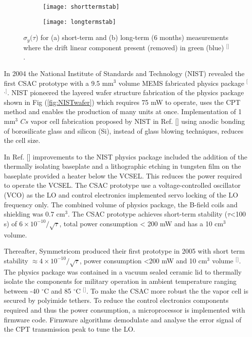 \begin{figure}[b]
\centering
\begin{subfigure}[b]{0.45\textwidth}
   \texttt{[image: shorttermstab]}
	\caption{\label{fig:shorttermstab}}
\end{subfigure}
\begin{subfigure}[b]{0.45\textwidth}
   \texttt{[image: longtermstab]}
	\caption{\label{fig:longtermstab}}
\end{subfigure}
\caption[]{$\sigma_{y}(\tau$) for (a) short-term and (b) long-term (6 months) measurements where the drift linear component present (removed) in green (blue) $^[$\citep{LutwakR.RashedA.Varghese2007TheEvaluation}$^]$.}
\end{figure}



In 2004 the National Institute of Standards and Technology (NIST) revealed the first CSAC prototype with a 9.5 mm$^3$ volume MEMS fabricated physics package $^[$\citep{Knappe2004AClock}$^,$\citep{Gerginov2005Component-levelReference}$^]$. NIST pioneered the layered wafer structure fabrication of the physics package shown in Fig (\ref{fig:NISTwafer}) which requires 75 mW to operate, uses the CPT method and enables the production of many units at once. Implementation of 1 mm$^3$ $Cs$ vapor cell fabrication proposed by NIST in Ref. [] using anodic bonding of borosilicate glass and silicon (Si), instead of glass blowing techniques, reduces the cell size.  



In Ref. [] improvements to the NIST physics package included the addition of the thermally isolating baseplate and a lithographic etching in tungsten film on the baseplate provided a heater below the VCSEL. This reduces the power required to operate the VCSEL. The CSAC prototype use a voltage-controlled oscillator (VCO) as the LO and control electronics implemented servo locking of the LO frequency only. The combined volume of physics package, the B-field coils and shielding was 0.7 cm$^{3}$. The CSAC prototype achieves short-term stability ($\tau$<100 s) of $6\times10^{-10}/\sqrt{\tau}$, total power consumption < 200 mW and has a 10 cm$^{3}$ volume.

Thereafter, Symmetricom produced their first prototype in 2005 with short term stability $\approx4\times 10^{-10}/\sqrt{\tau}$, power consumption <200 mW and 10 cm$^{3}$ volume $^[$\citep{LutwakTheClock}$^]$. The physics package was contained in a vacuum sealed ceramic lid to thermally isolate the components for military operation in ambient temperature ranging between -40 $^{\circ }\textrm{C}$ and 85 $^{\circ }\textrm{C}$ $^[$\citep{LutwakTheClock}$^]$. To make the CSAC more robust the the vapor cell is secured by polyimide tethers. To reduce the control electronics components required and thus the power consumption, a microprocessor is implemented with firmware code. Firmware algorithms demodulate and analyse the error signal of the CPT transmission peak to tune the LO.   



